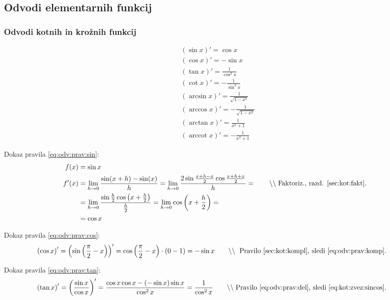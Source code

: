 \documentclass[a4paper,oneside,12pt,fleqn]{article}
\newcommand\krat\cdot
\newcommand{\comment}[1]{\ensuremath{\qquad\backslash\backslash\;}\textnormal{#1}}
\newcommand{\arccot}{\ensuremath{\operatorname{arccot}}} %
\def\kos{\cos}
\def\limh{\lim_{h\rightarrow0}} %
\numberwithin{equation}{section}
\begin{document}
\subsection{Odvodi elementarnih funkcij}
\label{sec:odv:elem}
\subsubsection{Odvodi kotnih in krožnih funkcij}
\label{sec:odv:elem:kot}

\begin{align}
  & \left( \sin x \right)' = \kos x \label{eq:odv:prav:sin} \\
  & \left( \kos x \right)' = -\sin x \label{eq:odv:prav:cos} \\
  & \left( \tan x \right)' = \frac{1}{\kos^2x} \label{eq:odv:prav:tan} \\
  & \left( \cot x \right)' = -\frac{1}{\sin^2x} \label{eq:odv:prav:cot} \\
  & \left( \arcsin x \right)' = \frac{1}{\sqrt{1-x^2}} \label{eq:odv:prav:asin} \\ 
  & \left( \arccos x \right)' = -\frac{1}{\sqrt{1-x^2}} \label{eq:odv:prav:acos} \\ 
  & \left( \arctan x \right)' = \frac{1}{x^2+1} \label{eq:odv:prav:atan} \\ 
  & \left( \arccot x \right)' = -\frac{1}{x^2+1} \label{eq:odv:prav:acot}
\end{align}

Dokaz pravila \eqref{eq:odv:prav:sin}:
\begin{align*}
  f(x) &= \sin x \\
  f'(x) &= \limh\frac{\sin(x+h)-\sin(x)}{h} =
  \limh\frac{2\sin\frac{x+h-x}{2}\cos\frac{x+h+x}{2}}{h} = \comment{Faktoriz., razd. \ref{sec:kot:fakt}.} \\
  &= \limh\frac{\sin\frac{h}{2}\kos\left( x+\frac{h}{2} \right)}{\frac{h}{2}} =
  \limh\kos\left( x+\frac{h}{2} \right) = \\ &= \kos x
\end{align*}

Dokaz pravila \eqref{eq:odv:prav:cos}:
\begin{align*}
  \left( \kos x \right)' &= \left( \sin\left( \frac{\pi}{2} - x \right) \right)' =
  \kos\left( \frac{\pi}{2} - x \right) \krat \left( 0 - 1 \right) = -\sin x
  \comment{ Pravilo \ref{sec:kot:kompl}, sledi \eqref{eq:odv:prav:komp}.}
\end{align*}

Dokaz pravila \eqref{eq:odv:prav:tan}:
\begin{align*}
  \left( \tan x \right)' &= \left( \frac{\sin x}{\kos x} \right)' = \frac{\kos x\kos x -
  \left( -\sin x \right)\sin x}{\kos^2x} = \frac{1}{\kos^2x} \comment{Pravilo
  \ref{eq:odv:prav:del}, sledi \eqref{eq:kot:zvez:sincos}.} 
\end{align*}
\end{document}

